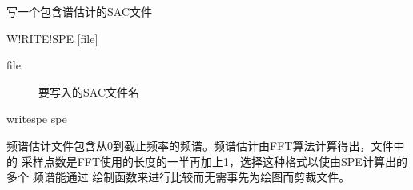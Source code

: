 \label{spe:writespe}

写一个包含谱估计的SAC文件

\begin{SACSTX}
W!RITE!SPE [file]
\end{SACSTX}

\begin{description}
\item [file] 要写入的SAC文件名
\end{description}

\begin{SACDFT}
writespe spe
\end{SACDFT}

频谱估计文件包含从0到截止频率的频谱。频谱估计由FFT算法计算得出，文件中的
采样点数是FFT使用的长度的一半再加上1，选择这种格式以使由SPE计算出的多个
频谱能通过  绘制函数来进行比较而无需事先为绘图而剪裁文件。
